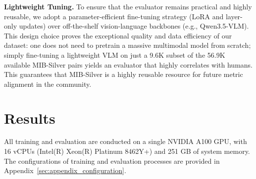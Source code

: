 \documentclass{article}
\begin{document}
\textbf{Lightweight Tuning.} 
To ensure that the evaluator remains practical and highly reusable, we adopt a parameter-efficient fine-tuning strategy (LoRA and layer-only updates) over off-the-shelf vision-language backbones (e.g., Qwen3.5-VLM). This design choice proves the exceptional quality and data efficiency of our dataset: one does not need to pretrain a massive multimodal model from scratch; simply fine-tuning a lightweight VLM on just a 9.6K subset of the 56.9K available MIB-Silver pairs yields an evaluator that highly correlates with humans. This guarantees that MIB-Silver is a highly reusable resource for future metric alignment in the community.









\section{Results}
All training and evaluation are conducted on a single NVIDIA A100 GPU, with 16 vCPUs (Intel(R) Xeon(R) Platinum 8462Y+) and 251 GB of system memory. The configurations of training and evaluation processes are provided in Appendix~\ref{sec:appendix_configuration}.

\end{document}
